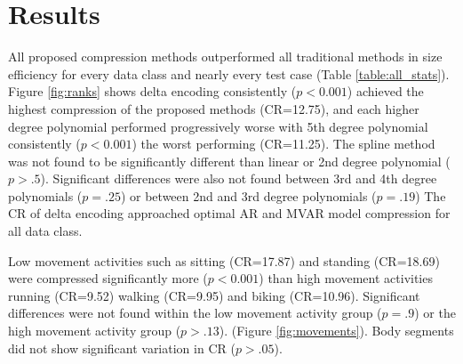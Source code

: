 \documentclass[journal]{IEEEtran}
\begin{document}
\section{Results}

All proposed compression methods outperformed all traditional methods in size efficiency for every data class and nearly every test case (Table \ref{table:all_stats}). Figure \ref{fig:ranks} shows delta encoding consistently ($p<0.001$) achieved the highest compression of the proposed methods (CR=12.75), and each higher degree polynomial performed progressively worse with 5th degree polynomial consistently ($p<0.001$) the worst performing (CR=11.25). The spline method was not found to be significantly different than linear or 2nd degree polynomial ($p>.5$). Significant differences were also not found between 3rd and 4th degree polynomials ($p=.25$) or between 2nd and 3rd degree polynomials ($p=.19$) The CR of delta encoding approached optimal AR and MVAR model compression for all data class.

Low movement activities such as sitting (CR=17.87) and standing  (CR=18.69) were compressed significantly more ($p<0.001$) than high movement activities running (CR=9.52) walking (CR=9.95) and biking (CR=10.96). Significant differences were not found within the low movement activity group ($p=.9$) or the high movement activity group ($p>.13$). (Figure \ref{fig:movements}). Body segments did not show significant variation in CR ($p>.05$).
\end{document}
